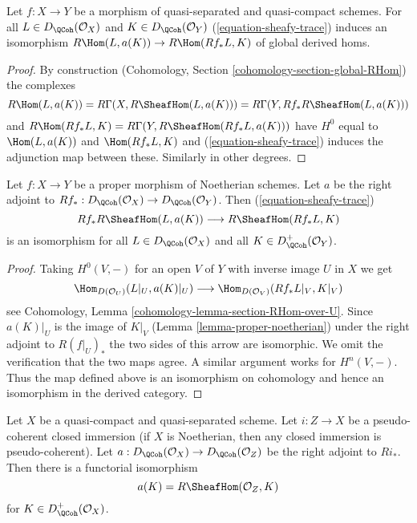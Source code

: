 \begin{lemma}
\label{lemma-iso-global-hom}
Let $f : X \to Y$ be a morphism of quasi-separated and quasi-compact
schemes.
For all $L \in D_\QCoh(\mathcal{O}_X)$ and $K \in D_\QCoh(\mathcal{O}_Y)$
(\ref{equation-sheafy-trace}) induces an isomorphism
$R\Hom(L, a(K)) \to R\Hom(Rf_*L, K)$ of global derived homs.
\end{lemma}

\begin{proof}
By construction (Cohomology, Section \ref{cohomology-section-global-RHom})
the complexes
$$
R\Hom(L, a(K)) = R\Gamma(X, R\SheafHom(L, a(K))) =
R\Gamma(Y, Rf_*R\SheafHom(L, a(K)))
$$
and $R\Hom(Rf_*L, K) = R\Gamma(Y, R\SheafHom(Rf_*L, a(K)))$
have $H^0$ equal to $\Hom(L, a(K))$ and $\Hom(Rf_*L, K)$ and
(\ref{equation-sheafy-trace}) induces the adjunction map
between these. Similarly in other degrees.
\end{proof}

\begin{lemma}
\label{lemma-proper-noetherian-relative}
Let $f : X \to Y$ be a proper morphism of Noetherian schemes.
Let $a$ be the right adjoint to
$Rf_* : D_\QCoh(\mathcal{O}_X) \to D_\QCoh(\mathcal{O}_Y)$.
Then (\ref{equation-sheafy-trace})
$$
Rf_*R\SheafHom(L, a(K)) \longrightarrow R\SheafHom(Rf_*L, K)
$$
is an isomorphism for all $L \in D_\QCoh(\mathcal{O}_X)$ and all
$K \in D^+_\QCoh(\mathcal{O}_Y)$.
\end{lemma}

\begin{proof}
Taking $H^0(V, -)$ for an open $V$ of $Y$ with inverse image $U$ in $X$ we get
$$
\Hom_{D(\mathcal{O}_U)}(L|_U, a(K)|_U) \longrightarrow
\Hom_{D(\mathcal{O}_V)}(Rf_*L|_V, K|_V)
$$
see Cohomology, Lemma \ref{cohomology-lemma-section-RHom-over-U}.
Since $a(K)|_U$ is the image of $K|_V$ (Lemma \ref{lemma-proper-noetherian})
under the right adjoint to $R(f|_U)_*$ the two
sides of this arrow are isomorphic. We omit the verification that
the two maps agree. A similar argument works for $H^n(V, -)$.
Thus the map defined above is an isomorphism on cohomology
and hence an isomorphism in the derived category.
\end{proof}

\begin{lemma}
\label{lemma-twisted-inverse-image-closed}
Let $X$ be a quasi-compact and quasi-separated scheme.
Let $i : Z \to X$ be a pseudo-coherent closed immersion
(if $X$ is Noetherian, then any closed immersion is pseudo-coherent).
Let $a : D_\QCoh(\mathcal{O}_X) \to D_\QCoh(\mathcal{O}_Z)$ be the
right adjoint to $Ri_*$. Then there is a functorial isomorphism
$$
a(K) = R\SheafHom(\mathcal{O}_Z, K)
$$
for $K \in D_\QCoh^+(\mathcal{O}_X)$.
\end{lemma}


